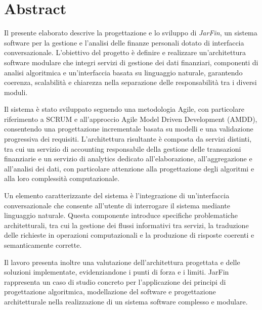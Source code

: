 \chapter*{Abstract}

Il presente elaborato descrive la progettazione e lo sviluppo di \textit{JarFin}, un sistema software per la gestione e l’analisi delle finanze personali dotato di interfaccia conversazionale. L’obiettivo del progetto è definire e realizzare un’architettura software modulare che integri servizi di gestione dei dati finanziari, componenti di analisi algoritmica e un’interfaccia basata su linguaggio naturale, garantendo coerenza, scalabilità e chiarezza nella separazione delle responsabilità tra i diversi moduli.

Il sistema è stato sviluppato seguendo una metodologia Agile, con particolare riferimento a SCRUM e all’approccio Agile Model Driven Development (AMDD), consentendo una progettazione incrementale basata su modelli e una validazione progressiva dei requisiti. L’architettura risultante è composta da servizi distinti, tra cui un servizio di accounting responsabile della gestione delle transazioni finanziarie e un servizio di analytics dedicato all’elaborazione, all’aggregazione e all’analisi dei dati, con particolare attenzione alla progettazione degli algoritmi e alla loro complessità computazionale.

Un elemento caratterizzante del sistema è l’integrazione di un’interfaccia conversazionale che consente all’utente di interrogare il sistema mediante linguaggio naturale. Questa componente introduce specifiche problematiche architetturali, tra cui la gestione dei flussi informativi tra servizi, la traduzione delle richieste in operazioni computazionali e la produzione di risposte coerenti e semanticamente corrette.

Il lavoro presenta inoltre una valutazione dell’architettura progettata e delle soluzioni implementate, evidenziandone i punti di forza e i limiti. JarFin rappresenta un caso di studio concreto per l’applicazione dei principi di progettazione algoritmica, modellazione del software e progettazione architetturale nella realizzazione di un sistema software complesso e modulare.